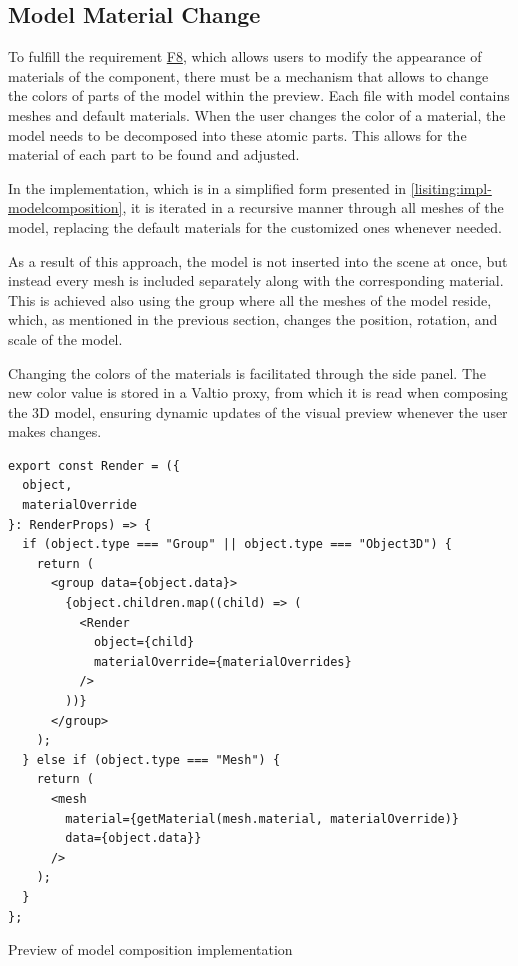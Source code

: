\subsection{Model Material Change}

To fulfill the requirement \hyperref[itm:F8]{F8}, which allows users to modify the appearance of materials of the component, there must be a mechanism that allows to change the colors of parts of the model within the preview. Each  file with model contains meshes and default materials. When the user changes the color of a material, the model needs to be decomposed into these atomic parts. This allows for the material of each part to be found and adjusted. 

In the implementation, which is in a simplified form presented in \autoref{lisiting:impl-modelcomposition}, it is iterated in a recursive manner through all meshes of the model, replacing the default materials for the customized ones whenever needed. 

As a result of this approach, the model is not inserted into the scene at once, but instead every mesh is included separately along with the corresponding material. This is achieved also using the group where all the meshes of the model reside, which, as mentioned in the previous section, changes the position, rotation, and scale of the model.

Changing the colors of the materials is facilitated through the side panel. The new color value is stored in a Valtio proxy, from which it is read when composing the 3D model, ensuring dynamic updates of the visual preview whenever the user makes changes.

\begin{listing}[h!]
\begin{verbatim}
export const Render = ({
  object,
  materialOverride
}: RenderProps) => {
  if (object.type === "Group" || object.type === "Object3D") {
    return (
      <group data={object.data}>
        {object.children.map((child) => (
          <Render
            object={child}
            materialOverride={materialOverrides}
          />
        ))}
      </group>
    );
  } else if (object.type === "Mesh") {
    return (
      <mesh
        material={getMaterial(mesh.material, materialOverride)}
        data={object.data}}
      />
    );
  }
};
\end{verbatim}
\caption{Preview of model composition implementation}
\label{lisiting:impl-modelcomposition}
\end{listing}


